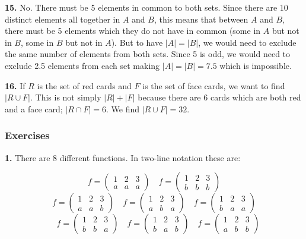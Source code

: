 \documentclass[10pt,]{memoir}
\theoremstyle{plain}
\theoremstyle{definition}
\theoremstyle{definition}
\theoremstyle{definition}
\numberwithin{equation}{chapter}
\newcommand{\amp}{ & }
\begin{document}
\par\smallskip
\noindent\textbf{15.}\quad{}
          No. There must be 5 elements in common to both sets. Since there are 10 distinct elements all together in \(A\) and \(B\), this means that between \(A\) and \(B\), there must be 5 elements which they do not have in common (some in \(A\) but not in \(B\), some in \(B\) but not in \(A\)). But to have \(|A| = |B|\), we would need to exclude the same number of elements from both sets.  Since 5 is odd, we would need to exclude 2.5 elements from each set making \(|A| = |B| = 7.5\) which is impossible.
\par\smallskip
\noindent\textbf{16.}\quad{}
          If \(R\) is the set of red cards and \(F\) is the set of face cards, we want to find \(|R \cup F|\). This is not simply \(|R| + |F|\) because there are 6 cards which are both red and a face card; \(|R \cap F| = 6\). We find
          \(|R \cup F| = 32\).
\par\smallskip
\subsubsection*{ Exercises}
\noindent\textbf{1.}\quad{}
            There are 8 different functions. In two-line notation these are:


              \begin{equation*} f = \begin{pmatrix} 1 \amp 2 \amp 3 \\ a \amp a\amp a \end{pmatrix} \quad f = \begin{pmatrix} 1 \amp 2 \amp 3 \\ b \amp b \amp b \end{pmatrix}\end{equation*}
              \begin{equation*} f = \begin{pmatrix} 1 \amp 2 \amp 3 \\ a \amp a\amp b \end{pmatrix} \quad f = \begin{pmatrix} 1 \amp 2 \amp 3 \\ a \amp b \amp a \end{pmatrix} \quad f = \begin{pmatrix} 1 \amp 2 \amp 3 \\ b \amp a\amp a \end{pmatrix}
              \end{equation*}
              \begin{equation*}
                \quad f = \begin{pmatrix} 1 \amp 2 \amp 3 \\ b \amp b \amp a \end{pmatrix} \quad f = \begin{pmatrix} 1 \amp 2 \amp 3 \\ b \amp a\amp b \end{pmatrix} \quad f = \begin{pmatrix} 1 \amp 2 \amp 3 \\ a \amp b \amp b \end{pmatrix} \end{equation*}
\end{document}
